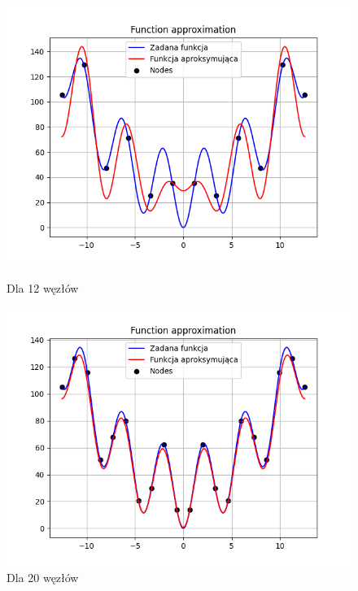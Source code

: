 \documentclass{article}
\begin{document}
\begin{figure}[H]
  \begin{minipage}[b]{0.49\textwidth}
    \begin{minipage}[b]{\textwidth}
      \includegraphics[width=\textwidth]{img34.png}
      \caption{Dla 12 węzłów}
    \end{minipage}
    \vspace*{\fill}
    \begin{minipage}[b]{\textwidth}
      \includegraphics[width=\textwidth]{img35.png}
      \caption{Dla 20 węzłów}
    \end{minipage}
  \end{minipage}
  \hfill
  \begin{minipage}[b]{0.49\textwidth}

\end{minipage}
\end{figure}
\end{document}
